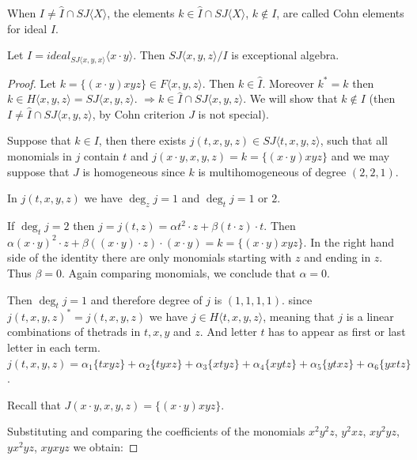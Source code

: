 \documentclass{article}
\begin{document}
\begin{definition} 
When $I\neq \hat{I } \cap SJ\langle X \rangle$, the elements $k \in \hat{I} \cap SJ\langle X \rangle$, $k \notin I$, are called Cohn elements for ideal $I$.  
\end{definition}

\begin{theorem} 
Let $I = ideal_{SJ\langle x, y, x \rangle} \langle x \cdot y \rangle$. Then $SJ\langle x, y, z \rangle / I$ is exceptional algebra.  
\end{theorem}

\begin{proof} 
 Let $k = \{(x \cdot y)xyz\} \in F\langle x, y, z \rangle$. Then $k \in \hat{I}$. Moreover $k^* = k$ then $k \in H\langle x, y, z \rangle = SJ\langle x, y, z \rangle$.  
$\Rightarrow k \in \hat{I} \cap SJ\langle x, y, z \rangle$. We will show that $k \notin I$ (then $I \neq \hat{I} \cap SJ\langle x, y, z \rangle $, by Cohn criterion $J$ is not special).  

Suppose that $k \in I$, then there exists $j(t, x, y, z) \in SJ \langle t, x, y, z \rangle$, such that all monomials in $j$ contain $t$ and $j(x\cdot y,x, y, z) = k = \{(x \cdot y)xyz\}$ and we may suppose that $J$ is homogeneous since $k$ is multihomogeneous of degree $(2, 2, 1)$.  

In $j(t,x, y, z)$ we have $\deg_z j = 1$ and $\deg_t j = 1$ or $2$. 

If $\deg_t j = 2$ then $j =j(t,z)= \alpha t^2 \cdot z + \beta (t \cdot z) \cdot t$. Then $\alpha (x \cdot y)^2 \cdot z + \beta ((x \cdot y) \cdot z) \cdot (x \cdot y) = k = \{(x \cdot y)xyz\}$. In the right hand side of the identity there are only monomials starting with $z$ and ending in $z$. Thus $\beta = 0$. Again comparing monomials, we conclude that $\alpha = 0$. 

Then $\deg_t j = 1$ and therefore degree of $j$ is $ (1, 1, 1, 1)$.  
since $j(t, x, y, z)^* = j(t, x, y, z)$ we have $j \in H \langle t, x, y, z \rangle$, meaning that $j$ is a linear combinations of thetrads in $t, x, y$ and $z$. And letter $t$ has to appear as first or last letter in each term.  
$j(t, x, y, z) = \alpha_1 \{t xyz\} + \alpha_2 \{t yxz\} + \alpha_3 \{x t y z\} + \alpha_4 \{x y t z\} + \alpha_5 \{ytxz\} + \alpha_6 \{y x t z\}$.  

Recall that $J(x \cdot y, x,y, z) = \{(x \cdot y)xyz\}$.  

Substituting and comparing the coefficients of the monomials $x^2y^2 z$, $y^2 xz$, $ xy^2yz $, $yx^2yz$, $xyxyz$ we obtain:  


\end{proof}
\end{document}
